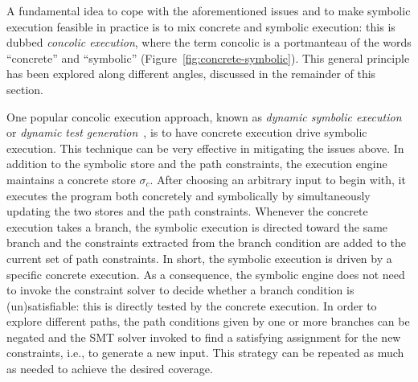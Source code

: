 {\begin{enumerate}

\end{enumerate}

\noindent A fundamental idea to cope with the aforementioned issues and to make symbolic execution feasible in practice is to mix concrete and symbolic execution: this is dubbed {\em concolic execution}, where the term concolic is a portmanteau of the words ``concrete'' and ``symbolic'' (Figure~\ref{fig:concrete-symbolic}). This general principle has been explored along different angles, discussed in the remainder of this section. %

 One popular concolic execution approach, known as {\em dynamic symbolic execution} or {\em dynamic test generation}~\cite{DART-PLDI05}, is to have concrete execution drive symbolic execution. This technique can be very effective in mitigating the issues above. In addition to the symbolic store and the path constraints, the execution engine maintains a concrete store $\sigma_c$. After choosing an arbitrary input to begin with, it executes the program both concretely and symbolically by simultaneously updating the two stores and the path constraints. Whenever the concrete execution takes a branch, the symbolic execution is directed toward the same branch and the constraints extracted from the branch condition are added to the current set of path constraints. In short, the symbolic execution is driven by a specific concrete execution. As a consequence, the symbolic engine does not need to invoke the constraint solver to decide whether a branch condition is (un)satisfiable: this is directly tested by the concrete execution. In order to explore different paths, the path conditions given by one or more branches can be negated and the SMT solver invoked to find a satisfying assignment for the new constraints, i.e., to generate a new input.  This strategy can be repeated as much as needed to achieve the desired coverage. 
}

